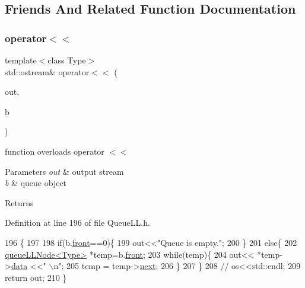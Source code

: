\subsection{Friends And Related Function Documentation}
\mbox{\label{classqueue_l_l_a24d410ee760513f96b06f242b1025e8e}} 
\subsubsection{\texorpdfstring{operator$<$$<$}{operator<<}}
{\footnotesize\ttfamily template$<$class Type$>$ \\
std\+::ostream\& operator$<$$<$ (\begin{DoxyParamCaption}\item[{std\+::ostream \&}]{out,  }\item[{const \hyperlink{classqueue_l_l}{queue\+LL}$<$ Type $>$ \&}]{b }\end{DoxyParamCaption})\hspace{0.3cm}{\ttfamily [friend]}}

function overloads operator $<$$<$ 
\begin{DoxyParams}{Parameters}
{\em out} & output stream \\
\hline
{\em b} & queue object \\
\hline
\end{DoxyParams}
\begin{DoxyReturn}{Returns}

\end{DoxyReturn}


Definition at line 196 of file Queue\+L\+L.\+h.


\begin{DoxyCode}
196                                                                       \{
197 
198         \textcolor{keywordflow}{if}(b.\hyperlink{classqueue_l_l_a622ea439d113fe8e4616320ec2346d8b}{front}==0)\{
199             out<<\textcolor{stringliteral}{"Queue is empty."};
200         \}
201         \textcolor{keywordflow}{else}\{
202             \hyperlink{classqueue_l_l_node}{queueLLNode<Type>} *temp=b.\hyperlink{classqueue_l_l_a622ea439d113fe8e4616320ec2346d8b}{front};
203             \textcolor{keywordflow}{while}(temp)\{
204                 out<< *temp->\hyperlink{classqueue_l_l_node_a20b1170d8c5852b7dc01e56fda4e4206}{data} <<\textcolor{stringliteral}{" \(\backslash\)n"};
205                 temp = temp->\hyperlink{classqueue_l_l_node_ab8367d61c51828d9f21d72537b62735f}{next};
206             \}
207         \}
208 \textcolor{comment}{//      os<<std::endl;}
209         \textcolor{keywordflow}{return} out;
210     \}
\end{DoxyCode}


